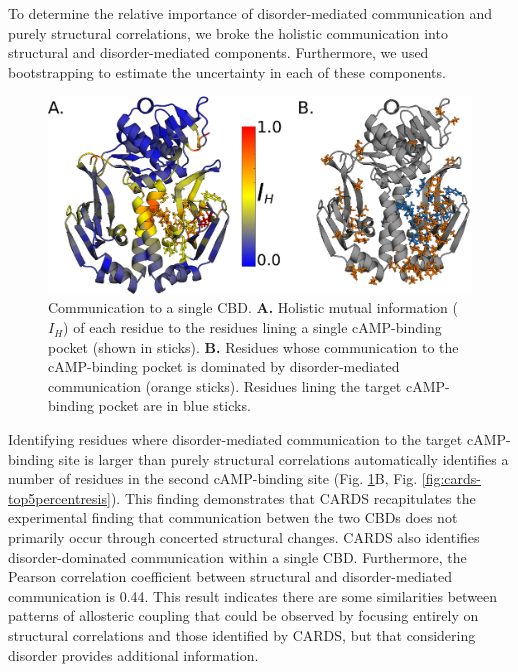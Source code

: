 \documentclass[../main.tex]{subfiles}
\begin{document}
        To determine the relative importance of disorder-mediated communication and purely structural correlations, we broke the holistic communication into structural and disorder-mediated components. Furthermore, we used bootstrapping to estimate the uncertainty in each of these components.

    \begin{figure}[!htb] %
        \centering
        \includegraphics[width=4.5in]{cap-targetsite-fig.eps}
        \caption[Communication to a single CBD.]
            {Communication to a single CBD. \textbf{A.} Holistic mutual information ($I_H$) of each residue to the residues lining a single cAMP-binding pocket (shown in sticks). \textbf{B.} Residues whose communication to the cAMP-binding pocket is dominated by disorder-mediated communication (orange sticks).  Residues lining the target cAMP-binding pocket are in blue sticks.}
        \label{fig:cap-targetsite-fig}
    \end{figure} 

        Identifying residues where disorder-mediated communication to the target cAMP-binding site is larger than purely structural correlations automatically identifies a number of residues in the second cAMP-binding site (Fig. \ref{fig:cap-targetsite-fig}B, Fig. \ref{fig:cards-top5percentresis}). This finding demonstrates that CARDS recapitulates the experimental finding that communication betwen the two CBDs does not primarily occur through concerted structural changes\cite{Tzeng:2009im}. CARDS also identifies disorder-dominated communication within a single CBD. Furthermore, the Pearson correlation coefficient between structural and disorder-mediated communication is 0.44. This result indicates there are some similarities between patterns of allosteric coupling that could be observed by focusing entirely on structural correlations and those identified by CARDS, but that considering disorder provides additional information.
\end{document}

